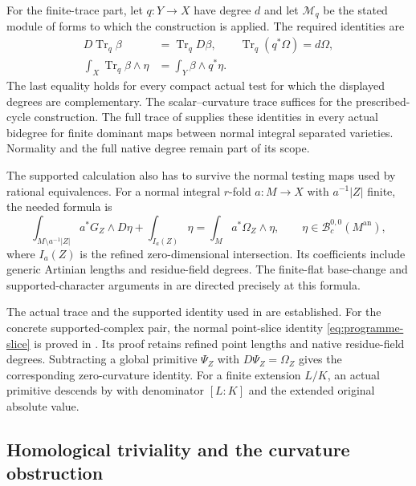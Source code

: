 \documentclass[11pt]{article}
\theoremstyle{definition}
\numberwithin{equation}{section}
\newcommand{\an}{\mathrm{an}}
\newcommand{\B}{\mathcal B}
\newcommand{\Tr}{\operatorname{Tr}}
\begin{document}
For the finite-trace part, let $q:Y\to X$ have degree $d$ and let $\mathcal M_q$ be the stated module of forms to which the construction is applied. The required identities are
\begin{equation}\label{eq:programme-trace}
 \begin{split}
 D\Tr_q\beta&=\Tr_q D\beta,\qquad
 \Tr_q(q^*\Omega)=d\Omega,\\
 \int_X\Tr_q\beta\wedge\eta&=\int_Y\beta\wedge q^*\eta.
 \end{split}
\end{equation}
The last equality holds for every compact actual test for which the displayed degrees are complementary. The scalar--curvature trace suffices for the prescribed-cycle construction. The full trace of  supplies these identities in every actual bidegree for finite dominant maps between normal integral separated varieties. Normality and the full native degree remain part of its scope.

The supported calculation also has to survive the normal testing maps used by rational equivalences. For a normal integral $r$-fold $a:M\to X$ with $a^{-1}|Z|$ finite, the needed formula is
\begin{equation}\label{eq:programme-slice}
 \int_{M\setminus a^{-1}|Z|}a^*G_Z\wedge D\eta
   +\int_{I_a(Z)}\eta
 =\int_M a^*\Omega_Z\wedge\eta,
 \qquad \eta\in\B_c^{0,0}(M^{\an}),
\end{equation}
where $I_a(Z)$ is the refined zero-dimensional intersection. Its coefficients include generic Artinian lengths and residue-field degrees. The finite-flat base-change and supported-character arguments in \cite[Section 3]{GlobalConstruction} are directed precisely at this formula.

The actual trace and the supported identity used in  are established. For the concrete supported-complex pair, the normal point-slice identity \eqref{eq:programme-slice} is proved in \cite[\texttt{r16h:curved-slice}]{HeightKernel}. Its proof retains refined point lengths and native residue-field degrees. Subtracting a global primitive $\Psi_Z$ with $D\Psi_Z=\Omega_Z$ gives the corresponding zero-curvature identity. For a finite extension $L/K$, an actual primitive descends by  with denominator $[L:K]$ and the extended original absolute value.

\subsection{Homological triviality and the curvature obstruction}\label{sec:programme-source}
\end{document}
